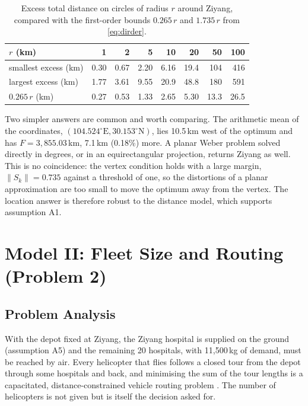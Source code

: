 \documentclass[11pt,a4paper]{article}
\theoremstyle{definition}
\begin{document}
\begin{table}[ht]
\centering
\caption{Excess total distance on circles of radius $r$ around Ziyang, compared with the first-order bounds $0.265\,r$ and $1.735\,r$ from \eqref{eq:dirder}.}\label{tab:flat}
\small
\begin{tabular}{lrrrrrrr}
\toprule
$r$ (km) & 1 & 2 & 5 & 10 & 20 & 50 & 100 \\
\midrule
smallest excess (km) & 0.30 & 0.67 & 2.20 & 6.16 & 19.4 & 104 & 416 \\
largest excess (km) & 1.77 & 3.61 & 9.55 & 20.9 & 48.8 & 180 & 591 \\
$0.265\,r$ (km) & 0.27 & 0.53 & 1.33 & 2.65 & 5.30 & 13.3 & 26.5 \\
\bottomrule
\end{tabular}
\end{table}

Two simpler answers are common and worth comparing.
The arithmetic mean of the coordinates, $(104.524^\circ\text{E}, 30.153^\circ\text{N})$, lies 10.5\,km west of the optimum and has $F=3{,}855.03$\,km, 7.1\,km (0.18\%) more.
A planar Weber problem solved directly in degrees, or in an equirectangular projection, returns Ziyang as well.
This is no coincidence: the vertex condition holds with a large margin, $\|S_k\|=0.735$ against a threshold of one, so the distortions of a planar approximation are too small to move the optimum away from the vertex.
The location answer is therefore robust to the distance model, which supports assumption A1.

\section{Model II: Fleet Size and Routing (Problem 2)}\label{sec:q2}

\subsection{Problem Analysis}
With the depot fixed at Ziyang, the Ziyang hospital is supplied on the ground (assumption A5) and the remaining 20 hospitals, with 11{,}500\,kg of demand, must be reached by air.
Every helicopter that flies follows a closed tour from the depot through some hospitals and back, and minimising the sum of the tour lengths is a capacitated, distance-constrained vehicle routing problem \citep{toth2014,laporte1992}.
The number of helicopters is not given but is itself the decision asked for.
\end{document}
